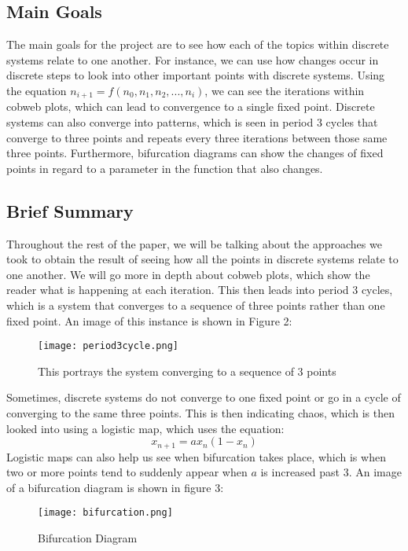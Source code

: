 \documentclass{article}
\begin{document}
\subsection{Main Goals}
The main goals for the project are to see how each of the topics within discrete systems relate to one another. For instance, we can use how changes occur in discrete steps to look into other important points with discrete systems. Using the equation $n_{i+1}=f(n_0,n_1,n_2,...,n_i)$, we can see the iterations within cobweb plots, which can lead to convergence to a single fixed point. Discrete systems can also converge into patterns, which is seen in period 3 cycles that converge to three points and repeats every three iterations between those same three points. Furthermore, bifurcation diagrams can show the changes of fixed points in regard to a parameter in the function that also changes.

\subsection{Brief Summary}
Throughout the rest of the paper, we will be talking about the approaches we took to obtain the result of seeing how all the points in discrete systems relate to one another. We will go more in depth about cobweb plots, which show the reader what is happening at each iteration. This then leads into period 3 cycles, which is a system that converges to a sequence of three points rather than one fixed point. \cite{shapiro2018scientific} An image of this instance is shown in Figure 2:
\begin{figure}[htp]
    \centering
    \texttt{[image: period3cycle.png]}
    \caption{This portrays the system converging to a sequence of 3 points}
    \label{fig:Period 3 Cycle}
\end{figure}

Sometimes, discrete systems do not converge to one fixed point or go in a cycle of converging to the same three points. This is then indicating chaos, which is then looked into using a logistic map, which uses the equation:
$$
x_{n+1}=ax_n(1-x_n)
$$
Logistic maps can also help us see when bifurcation takes place, which is when two or more points tend to suddenly appear when $a$ is increased past 3. \cite{weisstein2001logistic} An image of a bifurcation diagram is shown in figure 3:
\begin{figure}[htp]
    \centering
    \texttt{[image: bifurcation.png]}
    \caption{Bifurcation Diagram}
    \label{fig:Bifurcation Diagram}
\end{figure}
\end{document}

